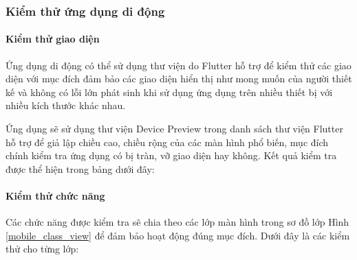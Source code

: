 \subsubsection{Kiểm thử ứng dụng di động}

\paragraph{Kiểm thử giao diện}
\mbox{}

Ứng dụng di động có thể sử dụng thư viện do Flutter hỗ trợ để kiểm thử các giao diện với mục đích
đảm bảo các giao diện hiển thị như mong muốn của người thiết kế và không có lỗi lớn phát sinh khi sử dụng
ứng dụng trên nhiều thiết bị với nhiều kích thước khác nhau.

Ứng dụng sẽ sử dụng thư viện Device Preview trong danh sách thư viện Flutter hỗ trợ để giả lập chiều cao, chiều rộng của
các màn hình phổ biến, mục đích chính kiểm tra ứng dụng có bị tràn, vỡ giao diện hay không. Kết quả kiểm tra được thể hiện
trong bảng dưới đây: 


\paragraph{Kiểm thử chức năng}
\mbox{}
Các chức năng được kiểm tra sẽ chia theo các lớp màn hình trong sơ đồ lớp Hình \ref{mobile_class_view} để đảm bảo hoạt động đúng mục đích. 
Dưới đây là các kiểm thử cho từng lớp:

